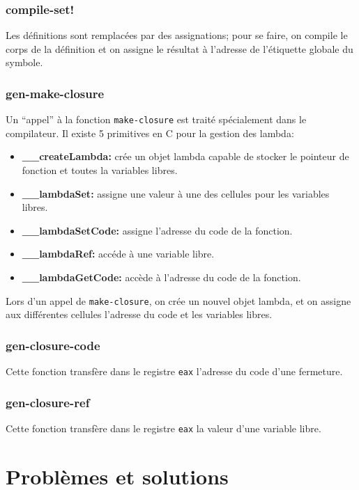 \documentclass[11pt]{report}
\begin{document}
\subsection{compile-set!}

Les définitions sont remplacées par des assignations; pour se faire,
on compile le corps de la définition et on assigne le résultat à
l'adresse de l'étiquette globale du symbole.

\subsection{gen-make-closure}

Un ``appel'' à la fonction {\tt make-closure} est traité spécialement
dans le compilateur.  Il existe 5 primitives en C pour la gestion des
lambda:

\begin{itemize}
\item {\bf __createLambda:} crée un objet lambda capable de stocker le
  pointeur de fonction et toutes la variables libres.
\item {\bf __lambdaSet:} assigne une valeur à une des cellules pour
  les variables libres.
\item {\bf __lambdaSetCode:} assigne l'adresse du code de la fonction.
\item {\bf __lambdaRef:} accéde à une variable libre.
\item {\bf __lambdaGetCode:} accède à l'adresse du code de la fonction.
\end{itemize}

Lors d'un appel de {\tt make-closure}, on crée un nouvel objet lambda,
et on assigne aux différentes cellules l'adresse du code et les
variables libres.


\subsection{gen-closure-code}

Cette fonction transfère dans le registre {\tt eax} l'adresse du code
d'une fermeture.


\subsection{gen-closure-ref}

Cette fonction transfère dans le registre {\tt eax} la valeur d'une
variable libre.



\chapter{Problèmes et solutions}
\end{document}
